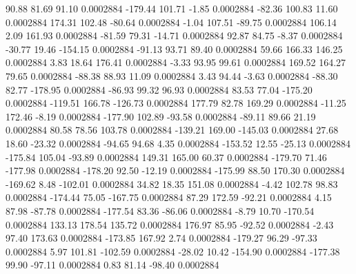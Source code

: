        90.88       81.69       91.10     0.0002884
     -179.44      101.71       -1.85     0.0002884
      -82.36      100.83       11.60     0.0002884
      174.31      102.48      -80.64     0.0002884
       -1.04      107.51      -89.75     0.0002884
      106.14        2.09      161.93     0.0002884
      -81.59       79.31      -14.71     0.0002884
       92.87       84.75       -8.37     0.0002884
      -30.77       19.46     -154.15     0.0002884
      -91.13       93.71       89.40     0.0002884
       59.66      166.33      146.25     0.0002884
        3.83       18.64      176.41     0.0002884
       -3.33       93.95       99.61     0.0002884
      169.52      164.27       79.65     0.0002884
      -88.38       88.93       11.09     0.0002884
        3.43       94.44       -3.63     0.0002884
      -88.30       82.77     -178.95     0.0002884
      -86.93       99.32       96.93     0.0002884
       83.53       77.04     -175.20     0.0002884
     -119.51      166.78     -126.73     0.0002884
      177.79       82.78      169.29     0.0002884
      -11.25      172.46       -8.19     0.0002884
     -177.90      102.89      -93.58     0.0002884
      -89.11       89.66       21.19     0.0002884
       80.58       78.56      103.78     0.0002884
     -139.21      169.00     -145.03     0.0002884
       27.68       18.60      -23.32     0.0002884
      -94.65       94.68        4.35     0.0002884
     -153.52       12.55      -25.13     0.0002884
     -175.84      105.04      -93.89     0.0002884
      149.31      165.00       60.37     0.0002884
     -179.70       71.46     -177.98     0.0002884
     -178.20       92.50      -12.19     0.0002884
     -175.99       88.50      170.30     0.0002884
     -169.62        8.48     -102.01     0.0002884
       34.82       18.35      151.08     0.0002884
       -4.42      102.78       98.83     0.0002884
     -174.44       75.05     -167.75     0.0002884
       87.29      172.59      -92.21     0.0002884
        4.15       87.98      -87.78     0.0002884
     -177.54       83.36      -86.06     0.0002884
       -8.79       10.70     -170.54     0.0002884
      133.13      178.54      135.72     0.0002884
      176.97       85.95      -92.52     0.0002884
       -2.43       97.40      173.63     0.0002884
     -173.85      167.92        2.74     0.0002884
     -179.27       96.29      -97.33     0.0002884
        5.97      101.81     -102.59     0.0002884
      -28.02       10.42     -154.90     0.0002884
     -177.38       99.90      -97.11     0.0002884
        0.83       81.14      -98.40     0.0002884
